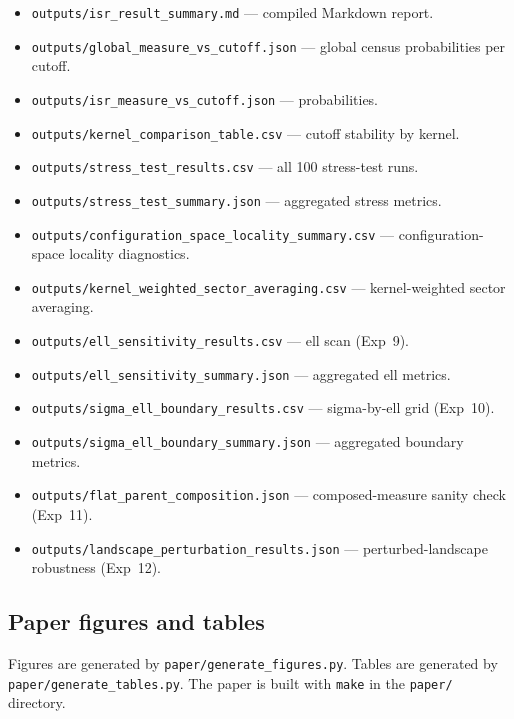 \begin{itemize}
  \item \texttt{outputs/isr\_result\_summary.md} --- compiled Markdown report.
  \item \texttt{outputs/global\_measure\_vs\_cutoff.json} --- global census
        probabilities per cutoff.
  \item \texttt{outputs/isr\_measure\_vs\_cutoff.json} --- \ISR probabilities.
  \item \texttt{outputs/kernel\_comparison\_table.csv} --- cutoff stability
        by kernel.
  \item \texttt{outputs/stress\_test\_results.csv} --- all 100 stress-test runs.
  \item \texttt{outputs/stress\_test\_summary.json} --- aggregated stress metrics.
  \item \texttt{outputs/configuration\_space\_locality\_summary.csv} ---
        configuration-space locality diagnostics.
  \item \texttt{outputs/kernel\_weighted\_sector\_averaging.csv} ---
        kernel-weighted sector averaging.
  \item \texttt{outputs/ell\_sensitivity\_results.csv} --- ell scan (Exp~9).
  \item \texttt{outputs/ell\_sensitivity\_summary.json} --- aggregated ell metrics.
  \item \texttt{outputs/sigma\_ell\_boundary\_results.csv} --- sigma-by-ell grid (Exp~10).
  \item \texttt{outputs/sigma\_ell\_boundary\_summary.json} --- aggregated boundary metrics.
  \item \texttt{outputs/flat\_parent\_composition.json} --- composed-measure sanity check (Exp~11).
  \item \texttt{outputs/landscape\_perturbation\_results.json} --- perturbed-landscape robustness (Exp~12).
\end{itemize}

\subsection{Paper figures and tables}

Figures are generated by \texttt{paper/generate\_figures.py}.
Tables are generated by \texttt{paper/generate\_tables.py}.
The paper is built with \texttt{make} in the \texttt{paper/} directory.

